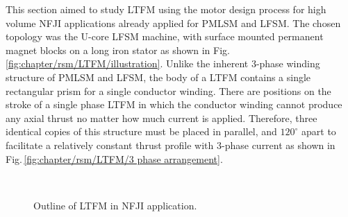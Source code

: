         
        This section aimed to study \acs{LTFM} using the motor design process for high volume \acs{NFJI} applications already applied for \acs{PMLSM} and \acs{LFSM}. The chosen topology was the U-core \acs{LFSM} machine, with surface mounted permanent magnet blocks on a long iron stator as shown in Fig.\,\ref{fig:chapter/rsm/LTFM/illustration}. Unlike the inherent 3-phase winding structure of \acs{PMLSM} and \acs{LFSM}, the body of a \acs{LTFM} contains a single rectangular prism for a single conductor winding. There are positions on the stroke of a single phase \acs{LTFM} in which the conductor winding cannot produce any axial thrust no matter how much current is applied. Therefore, three identical copies of this structure must be placed in parallel, and $120^\circ$ apart to facilitate a relatively constant thrust profile with 3-phase current as shown in Fig.\,\ref{fig:chapter/rsm/LTFM/3 phase arrangement}. 
        
        
        \begin{figure}[!ht]
            \centering
            \\
            \caption{Outline of \acs{LTFM} in \acs{NFJI} application.}
            \label{fig:chapter/rsm/LTFM/3-phase and NFJI}
        \end{figure}
        
